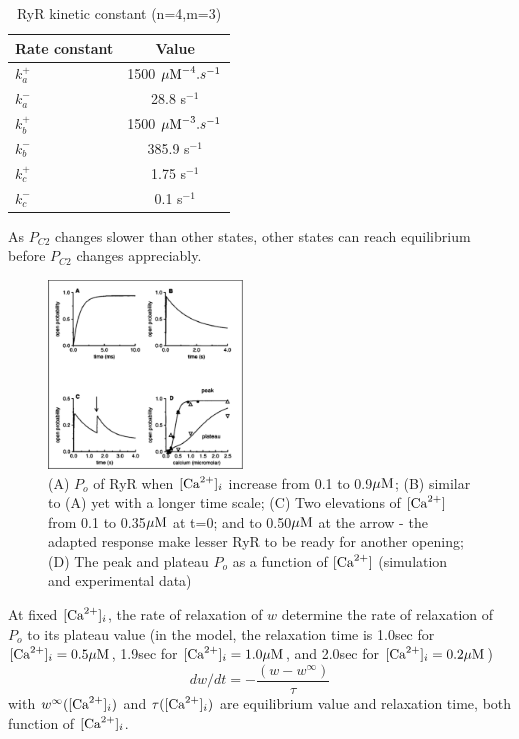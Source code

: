 \begin{table}[hbt]
\begin{center}
    \begin{tabular}{lc}
        \hline
        Rate constant & Value \\
        \hline \hline
        $k^+_a$  & 1500 ${\mu\text{M}}^{-4}.s^{-1}$ \\
        $k^-_a$ & 28.8 s$^{-1}$ \\
        $k^+_b$ & 1500 ${\mu\text{M}}^{-3}.s^{-1}$ \\
        $k^-_b$ & 385.9 s$^{-1}$ \\
        $k^+_c$ & 1.75 s$^{-1}$ \\
        $k^-_c$ & 0.1 s$^{-1}$ \\
        \hline
    \end{tabular}
\end{center}
\caption{RyR kinetic constant (n=4,m=3)}
\label{tab:keizer_RyR_constants}
\end{table}

As $P_{C2}$ changes slower than other states, other states can reach equilibrium
before $P_{C2}$ changes appreciably.

\begin{figure}[hbt]
  \centerline{\includegraphics[height=5cm,
    angle=0]{./images/Keizer_RyR_Po.eps}}
  \caption{(A) $P_o$ of RyR when $[{\text{Ca}^{2+}}]_i$ increase from 0.1 to 0.9${\mu\text{M}}$; (B)
  similar to (A) yet with a longer time scale; (C) Two elevations of $[{\text{Ca}^{2+}}]$
  from 0.1 to 0.35${\mu\text{M}}$ at t=0; and to 0.50${\mu\text{M}}$ at the arrow - the adapted
  response make lesser RyR to be ready for another opening; (D) The peak and
  plateau $P_o$ as a function of $[{\text{Ca}^{2+}}]$ (simulation and experimental data)}
  \label{fig:Keizer_RyR_Po}
\end{figure}

At fixed $[{\text{Ca}^{2+}}]_i$, the rate of relaxation of $w$ determine the rate of
relaxation of $P_o$ to its plateau value (in the model, the relaxation time is
1.0sec for $[{\text{Ca}^{2+}}]_i = 0.5{\mu\text{M}}$, 1.9sec for $[{\text{Ca}^{2+}}]_i = 1.0{\mu\text{M}}$, and 2.0sec for
$[{\text{Ca}^{2+}}]_i = 0.2{\mu\text{M}}$)
\begin{equation}
dw/dt = - \frac{(w - w^\infty)}{\tau}
\end{equation}
with $w^\infty( [{\text{Ca}^{2+}}]_i)$ and $\tau([{\text{Ca}^{2+}}]_i)$ are equilibrium value and
relaxation time, both function of $[{\text{Ca}^{2+}}]_i$.

